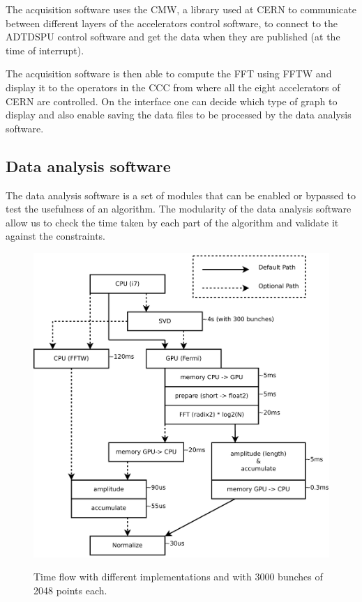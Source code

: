The acquisition software uses the \gls{CMW}, a library used at \gls{CERN} to communicate between different layers of the accelerators control software, to connect to the \gls{ADTDSPU} control software and get the data when they are published (at the time of interrupt).

The acquisition software is then able to compute the \gls{FFT} using \gls{FFTW} and display it to the operators in the \gls{CCC} from where all the eight accelerators of \gls{CERN} are controlled. On the interface one can decide which type of graph to display and also enable saving the data files to be processed by the data analysis software.

\subsection{Data analysis software}
\label{sec:data_analysis_software}

The data analysis software is a set of modules that can be enabled or bypassed to test the usefulness of an algorithm. The modularity of the data analysis software allow us to check the time taken by each part of the algorithm and validate it against the constraints.

\begin{figure}[H]
\caption{Time f\/low with different implementations and with 3000 bunches of 2048 points each.}
\centering
\includegraphics[scale=0.3]{PC-flow.pdf}
\label{fig:PCFlow}
\end{figure}

